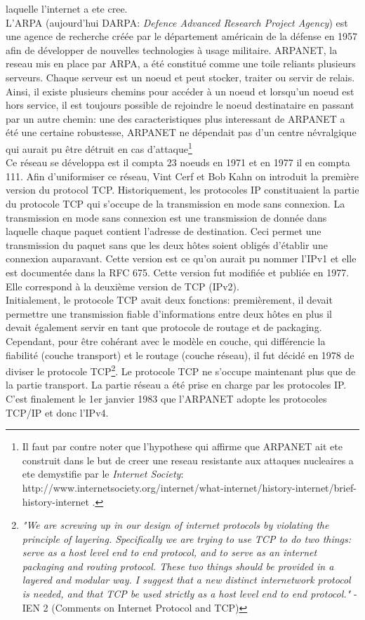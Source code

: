 laquelle l'internet a ete cree. 
\\
L'ARPA (aujourd'hui DARPA: {\it Defence Advanced Research Project Agency}) est
une agence de recherche créée par le département américain de la défense en
1957 afin de développer de nouvelles technologies à usage militaire.  ARPANET,
la reseau mis en place par ARPA, a été constitué comme une toile reliants
plusieurs serveurs. Chaque serveur est un noeud et peut stocker, traiter ou
servir de relais. Ainsi, il existe plusieurs chemins pour accéder à un noeud et
lorsqu'un noeud est hors service, il est toujours possible de rejoindre le
noeud destinataire en passant par un autre chemin: une des caracteristiques
plus interessant de ARPANET a été une certaine robustesse, ARPANET ne dépendait
pas d'un centre névralgique qui aurait pu être détruit en cas
d'attaque\footnote { Il faut par contre noter que l'hypothese qui affirme que
ARPANET ait ete construit dans le but de creer une reseau resistante aux
attaques nucleaires a ete demystifie par le {\it Internet Society}: 
http://www.internetsociety.org/internet/what-internet/history-internet/brief-history-internet
.}
\\
Ce réseau se développa est il compta 23 noeuds en 1971 et en 1977
il en compta 111. Afin d'uniformiser ce réseau, Vint Cerf et Bob Kahn on
introduit la première version du protocol TCP.  Historiquement, les protocoles
IP constituaient la partie du protocole TCP qui s'occupe de la transmission en
mode sans connexion. La transmission en mode sans connexion est une
transmission de donnée dans laquelle chaque paquet contient l'adresse de
destination. Ceci permet une transmission  du paquet sans que les deux hôtes
soient obligés d'établir une connexion auparavant. Cette version est ce qu'on
aurait pu nommer l'IPv1 et elle est documentée dans la RFC 675. Cette version
fut modifiée et publiée en 1977. Elle correspond à la deuxième version de TCP
(IPv2). 
\\
Initialement, le protocole TCP avait deux fonctions: premièrement, il devait
permettre une transmission fiable d'informations entre deux hôtes en plus
il devait
également servir en tant que protocole de routage et de packaging. 
Cependant,
pour être cohérant avec le modèle en couche, qui différencie la fiabilité
(couche transport) et le routage (couche réseau), il fut décidé en 1978 de
diviser le protocole TCP\footnote {
{\it "We are screwing up in our design of internet protocols by violating the
principle of layering. Specifically we are trying to use TCP to do two
things: serve as a host level end to end protocol, and to serve as an
internet packaging and routing protocol. These two things should be
provided in a layered and modular way. I suggest that a new distinct
internetwork protocol is needed, and that TCP be used strictly as a host
level end to end protocol." } - IEN 2 (Comments on Internet Protocol and TCP)
}.
Le protocole TCP ne s'occupe maintenant plus que de la partie transport. La
partie réseau a été prise en charge par les protocoles IP.  C'est finalement le
1er janvier 1983 que l'ARPANET adopte les protocoles TCP/IP et donc l'IPv4. 
